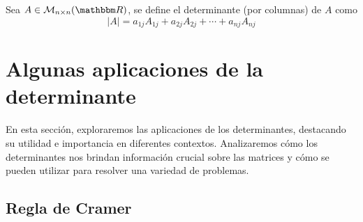 \begin{definition}
    Sea $A \in \mathcal{M}_{n \times n}(\RR)$, se define el determinante (por columnas) de $A$ como
    $$|A| = a_{1j}A_{1j} + a_{2j}A_{2j} + \cdots + a_{nj}A_{nj}$$
\end{definition}

\section{Algunas aplicaciones de la determinante}

En esta sección, exploraremos las aplicaciones de los determinantes, destacando su utilidad e importancia en diferentes contextos. Analizaremos cómo los determinantes nos brindan información crucial sobre las matrices y cómo se pueden utilizar para resolver una variedad de problemas.

\subsection{Regla de Cramer}

